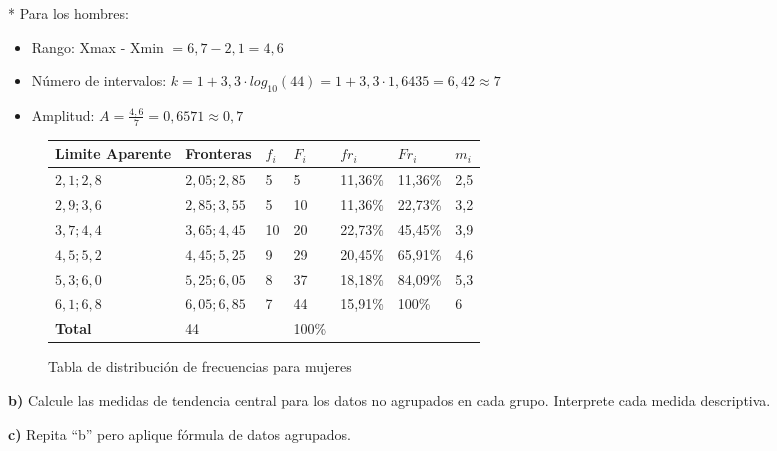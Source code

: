 \documentclass{templateNote}
\begin{document}
\newpage
* Para los hombres:\\
\begin{itemize}
    \item Rango: Xmax - Xmin $ = 6,7 - 2,1 = 4,6$
    
    \item Número de intervalos: $k = 1 + 3,3 \cdot log_{10}(44) = 1 + 3,3 \cdot 1,6435 = 6,42 \approx 7$
    
    \item Amplitud: $A = \frac{4,6}{7} = 0,6571 \approx 0,7$
\end{itemize}
\begin{figure}[H]
    \centering
    \begin{tabularx}{\textwidth}{|L|L|L|L|L|L|L|}
        \hline
        \textbf{Limite Aparente} & \textbf{Fronteras}& \textbf{$f_i$} & \textbf{$F_i$} & \textbf{$fr_i$} & \textbf{$Fr_i$} & \textbf{$m_i$} \\
        \hline
        $2,1;2,8$ & $2,05;2,85$ & 5 & 5 & 11,36\% & 11,36\% & 2,5 \\
        \hline
        $2,9;3,6$ & $2,85;3,55$ & 5 & 10 & 11,36\% & 22,73\% & 3,2 \\
        \hline
        $3,7;4,4$ & $3,65;4,45$ & 10 & 20 & 22,73\% & 45,45\% & 3,9 \\
        \hline
        $4,5;5,2$ & $4,45;5,25$ & 9 & 29 & 20,45\% & 65,91\% & 4,6 \\
        \hline
        $5,3;6,0$ & $5,25;6,05$ & 8 & 37 & 18,18\% & 84,09\% & 5,3 \\
        \hline
        $6,1;6,8$ & $6,05;6,85$ & 7 & 44 & 15,91\% & 100\% & 6 \\
        \hline
        \textbf{Total} & 44 &  & 100\% &  \\
        \hline
    \end{tabularx}
    \caption{Tabla de distribución de frecuencias para mujeres}
\end{figure}

\textbf{b)} Calcule las medidas de tendencia central para los datos no agrupados en cada grupo. Interprete cada medida descriptiva.

\textbf{c)} Repita “b” pero aplique fórmula de datos agrupados.
\end{document}
